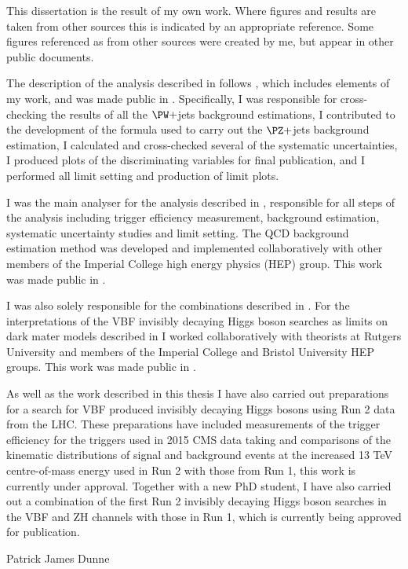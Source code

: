 \begin{declaration}
  This dissertation is the result of my own work. Where figures and results are taken from other sources this is indicated by an appropriate reference. Some figures referenced as from other sources were created by me, but appear in other public documents. 

The description of the analysis described in  follows , which includes elements of my work, and was made public in . Specifically, I was responsible for cross-checking the results of all the $\PW+$jets background estimations, I contributed to the development of the formula used to carry out the $\PZ+$jets background estimation, I calculated and cross-checked several of the systematic uncertainties, I produced plots of the discriminating variables for final publication, and I performed all limit setting and production of limit plots. 

I was the main analyser for the analysis described in , responsible for all steps of the analysis including trigger efficiency measurement, background estimation, systematic uncertainty studies and limit setting. The QCD background estimation method was developed and implemented collaboratively with other members of the Imperial College high energy physics (HEP) group. This work was made public in .

I was also solely responsible for the combinations described in . For the interpretations of the VBF invisibly decaying Higgs boson searches as limits on dark mater models described in  I worked collaboratively with theorists at Rutgers University and members of the Imperial College and Bristol University HEP groups. This work was made public in .

As well as the work described in this thesis I have also carried out preparations for a search for VBF produced invisibly decaying Higgs bosons using Run 2 data from the LHC. These preparations have included measurements of the trigger efficiency for the triggers used in 2015 CMS data taking and comparisons of the kinematic distributions of signal and background events at the increased 13 TeV centre-of-mass energy used in Run 2 with those from Run 1, this work is currently under approval. Together with a new PhD student, I have also carried out a combination of the first Run 2 invisibly decaying Higgs boson searches in the VBF and ZH channels with those in Run 1, which is currently being approved for publication.


  \vspace*{1cm}
  \begin{flushright}
    Patrick James Dunne
  \end{flushright}
\end{declaration}


